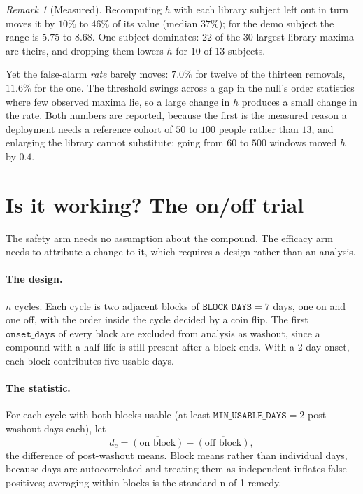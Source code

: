 \documentclass{article}
\theoremstyle{plain}
\theoremstyle{definition}
\theoremstyle{remark}
\newtheorem{remark}{Remark}[section]
\numberwithin{equation}{section}
\begin{document}
\begin{remark}[Measured]
Recomputing $h$ with each library subject left out in turn moves it by
$10\%$ to $46\%$ of its value (median $37\%$); for the demo subject the range
is $5.75$ to $8.68$. One subject dominates: $22$ of the $30$ largest library
maxima are theirs, and dropping them lowers $h$ for $10$ of $13$ subjects.

Yet the false-alarm \emph{rate} barely moves: $7.0\%$ for twelve of the
thirteen removals, $11.6\%$ for the one. The threshold swings across a gap in
the null's order statistics where few observed maxima lie, so a large change in
$h$ produces a small change in the rate. Both numbers are reported, because the
first is the measured reason a deployment needs a reference cohort of $50$ to
$100$ people rather than $13$, and enlarging the library cannot substitute:
going from $60$ to $500$ windows moved $h$ by $0.4$.
\end{remark}

\section{Is it working? The on/off trial}
\label{sec:efficacy}

The safety arm needs no assumption about the compound. The efficacy arm needs
to attribute a change to it, which requires a design rather than an analysis.

\paragraph{The design.} $n$ cycles. Each cycle is two adjacent blocks of
$\texttt{BLOCK\_DAYS}=7$ days, one on and one off, with the order inside the
cycle decided by a coin flip. The first $\texttt{onset\_days}$ of every block
are excluded from analysis as washout, since a compound with a half-life is
still present after a block ends. With a 2-day onset, each block contributes
five usable days.

\paragraph{The statistic.} For each cycle with both blocks usable (at least
$\texttt{MIN\_USABLE\_DAYS}=2$ post-washout days each), let
\[
  d_c = \overline{(\text{on block})} - \overline{(\text{off block})},
\]
the difference of post-washout means. Block means rather than individual days,
because days are autocorrelated and treating them as independent inflates false
positives; averaging within blocks is the standard n-of-1 remedy.
\end{document}
